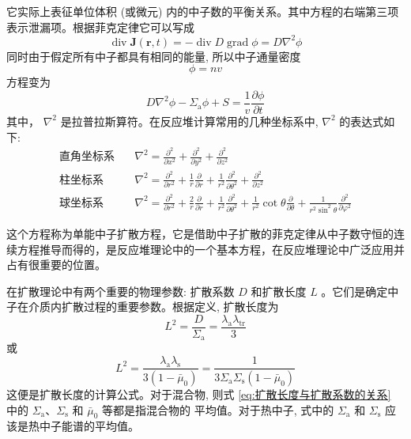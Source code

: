 \documentclass{Sichuan Normal University}
\begin{document}
它实际上表征单位体积 (或微元) 内的中子数的平衡关系。其中方程的右端第三项表示泄漏项。根据菲克定律它可以写成
\begin{equation}
    \operatorname{div} \boldsymbol{J}(\boldsymbol{r}, t)=-\operatorname{div} D \operatorname{grad} \phi=D \nabla^2 \phi
    \label{eq:中子数守恒4}
\end{equation}
同时由于假定所有中子都具有相同的能量, 所以中子通量密度
\begin{equation}
\phi=n v
\end{equation}
方程变为
\begin{equation}
    D \nabla^2 \phi-\Sigma_{\mathrm{a}} \phi+S=\frac{1}{v} \frac{\partial \phi}{\partial t}
    \label{eq:单能中子扩散方程}
\end{equation}其中， $\nabla^2$ 是拉普拉斯算符。在反应堆计算常用的几种坐标系中, $\nabla^2$ 的表达式如下:
\begin{align}
    \text{直角坐标系} & \quad \nabla^2 = \frac{\partial^2}{\partial x^2} + \frac{\partial^2}{\partial y^2} + \frac{\partial^2}{\partial z^2} \\
    \text{柱坐标系} & \quad \nabla^2 = \frac{\partial^2}{\partial r^2} + \frac{1}{r} \frac{\partial}{\partial r} + \frac{1}{r^2} \frac{\partial^2}{\partial \theta^2} + \frac{\partial^2}{\partial z^2} \\
    \text{球坐标系} & \quad \nabla^2 = \frac{\partial^2}{\partial r^2} + \frac{2}{r} \frac{\partial}{\partial r} + \frac{1}{r^2} \frac{\partial^2}{\partial \theta^2} + \frac{1}{r^2} \cot \theta \frac{\partial}{\partial \theta} + \frac{1}{r^2 \sin^2 \theta} \frac{\partial^2}{\partial \varphi^2}
    \end{align}
    
这个方程称为单能中子扩散方程，它是借助中子扩散的菲克定律从中子数守恒的连续方程推导而得的，是反应堆理论中的一个基本方程，在反应堆理论中广泛应用并占有很重要的位置。
\begin{remark}
    在扩散理论中有两个重要的物理参数: 扩散系数 $D$ 和扩散长度 $L$ 。它们是确定中子在介质内扩散过程的重要参数。根据定义, 扩散长度为
    \begin{equation}
L^2=\frac{D}{\Sigma_{\mathrm{a}}}=\frac{\lambda_{\mathrm{a}} \lambda_{\mathrm{tr}}}{3}
\end{equation}
或
\begin{equation}
L^2=\frac{\lambda_{\mathrm{a}} \lambda_{\mathrm{s}}}{3\left(1-\bar{\mu}_0\right)}=\frac{1}{3 \Sigma_{\mathrm{a}} \Sigma_{\mathrm{s}}\left(1-\bar{\mu}_0\right)}
\label{eq:扩散长度与扩散系数的关系}
\end{equation}
这便是扩散长度的计算公式。对于混合物, 则式 \eqref{eq:扩散长度与扩散系数的关系} 中的 $\Sigma_{\mathrm{a}} 、 \Sigma_{\mathrm{s}}$ 和 $\bar{\mu}_0$ 等都是指混合物的
平均值。对于热中子, 式中的 $\Sigma_{\mathrm{a}}$ 和 $\Sigma_{\mathrm{s}}$ 应该是热中子能谱的平均值。
\end{remark}
\end{document}
